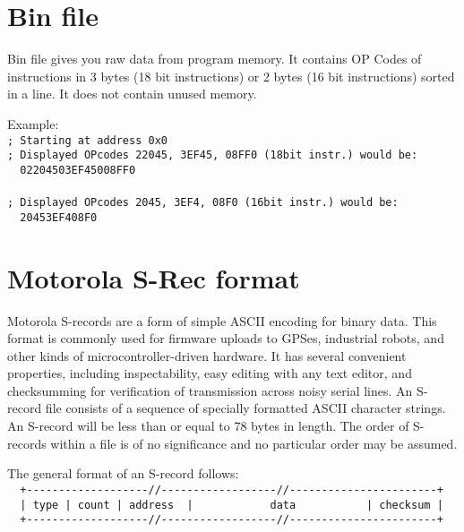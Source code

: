 \section{Bin file}
    Bin file gives you raw data from program memory. It contains OP Codes of instructions in 3 bytes (18 bit instructions) or 2 bytes (16 bit instructions) sorted in a line. It does not contain unused memory.

    Example:\\
    {
        \usecodefont
        \verb'; Starting at address 0x0'\\
        \verb'; Displayed OPcodes 22045, 3EF45, 08FF0 (18bit instr.) would be:'\\
        \verb'  02204503EF45008FF0 '\\\\
        \verb'; Displayed OPcodes 2045, 3EF4, 08F0 (16bit instr.) would be:'\\
        \verb'  20453EF408F0 '\\
    }

\section{Motorola S-Rec format}
    Motorola S-records are a form of simple ASCII encoding for binary data. This format is commonly used for firmware uploads to GPSes, industrial robots, and other kinds of microcontroller-driven hardware. It has several convenient properties, including inspectability, easy editing with any text editor, and checksumming for verification of transmission across noisy serial lines. An S-record file consists of a sequence of specially formatted ASCII character strings. An S-record will be less than or equal to 78 bytes in length. The order of S-records within a file is of no significance and no particular order may be assumed.

    The general format of an S-record follows:\\
    {
        \usecodefont
        \verb'  +-------------------//------------------//-----------------------+'\\
        \verb'  | type | count | address  |            data           | checksum |'\\
        \verb'  +-------------------//------------------//-----------------------+'\\
    }

